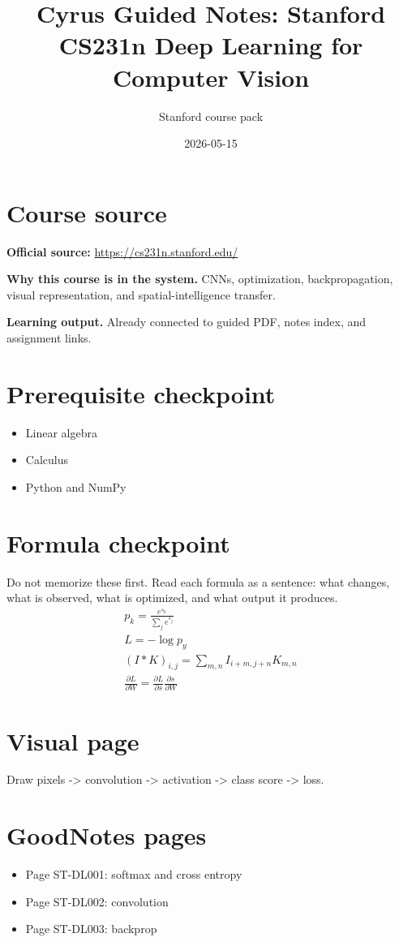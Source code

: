\documentclass[11pt]{article}
\title{Cyrus Guided Notes: Stanford CS231n Deep Learning for Computer Vision}
\author{Stanford course pack}
\date{2026-05-15}
\begin{document}
\maketitle

\section*{Course source}
\textbf{Official source:} \url{https://cs231n.stanford.edu/}

\textbf{Why this course is in the system.} CNNs, optimization, backpropagation, visual representation, and spatial-intelligence transfer.

\textbf{Learning output.} Already connected to guided PDF, notes index, and assignment links.

\section*{Prerequisite checkpoint}
\begin{itemize}[leftmargin=1.4em]
  \item Linear algebra
  \item Calculus
  \item Python and NumPy
\end{itemize}

\section*{Formula checkpoint}
Do not memorize these first. Read each formula as a sentence: what changes, what is observed, what is optimized, and what output it produces.
\begin{align*}
  p_k=\frac{e^{s_k}}{\sum_j e^{s_j}}\\
  L=-\log p_y\\
  (I*K)_{i,j}=\sum_{m,n}I_{i+m,j+n}K_{m,n}\\
  \frac{\partial L}{\partial W}=\frac{\partial L}{\partial s}\frac{\partial s}{\partial W}
\end{align*}

\section*{Visual page}
Draw pixels -> convolution -> activation -> class score -> loss.

\section*{GoodNotes pages}
\begin{itemize}[leftmargin=1.4em]
  \item Page ST-DL001: softmax and cross entropy
  \item Page ST-DL002: convolution
  \item Page ST-DL003: backprop
\end{itemize}
\end{document}
